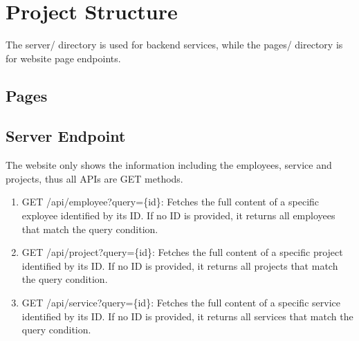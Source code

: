 
\section{Project Structure}
The server/ directory is used for backend services, while the pages/ directory is for website page endpoints.
\subsection{Pages}
\subsection{Server Endpoint}
The website only shows the information including the employees, service and projects, thus all APIs are GET methods.
\begin{enumerate}
	\item GET /api/employee?query=\{id\}: Fetches the full content of a specific exployee identified by its ID. If no ID is provided, it returns all employees that match the query condition.
	\item GET /api/project?query=\{id\}: Fetches the full content of a specific project identified by its ID. If no ID is provided, it returns all projects that match the query condition.
	\item GET /api/service?query=\{id\}: Fetches the full content of a specific service identified by its ID. If no ID is provided, it returns all services that match the query condition.
\end{enumerate}